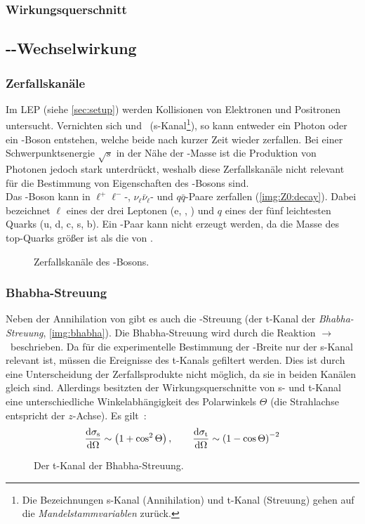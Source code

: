\subsubsection{Wirkungsquerschnitt }
\subsection{\texorpdfstring{\elp-\elm}{e+/e-}-Wechselwirkung}
\subsubsection{Zerfallskanäle}
Im LEP (siehe \autoref{sec:setup}) werden Kollisionen von Elektronen und Positronen untersucht.
Vernichten sich \elp und \elm\ (s-Kanal\footnote{Die Bezeichnungen s-Kanal (Annihilation) und t-Kanal (Streuung) gehen auf die 
\emph{Mandelstammvariablen} zurück.}), so kann entweder ein Photon oder ein \Z-Boson entstehen, welche beide nach kurzer Zeit wieder 
zerfallen. Bei einer Schwerpunktsenergie $\sqrt{s}$ in der Nähe der \Z-Masse ist die Produktion von Photonen jedoch stark unterdrückt, 
weshalb diese Zerfallskanäle nicht relevant für die Bestimmung von Eigenschaften des \Z-Bosons sind. \\
Das \Z-Boson kann in $\ell^+\ell^-$-, $\nu_\ell\bar{\nu}_\ell$- und $q\bar{q}$-Paare zerfallen (\autoref{img:Z0:decay}).
Dabei bezeichnet $\ell$ eines der drei Leptonen (e, \textmu, \texttau) und $q$ eines der fünf leichtesten Quarks (u, d, c, s, b). Ein -Paar 
kann nicht erzeugt werden, da die Masse des top-Quarks größer ist als die von \Z.
\begin{figure}[H]
        \centering
        \def\svgwidth{0.7\textwidth}
       
        \caption{Zerfallskanäle des \Z-Bosons.}
        \label{img:Z0:decay}
\end{figure}
\subsubsection{Bhabha-Streuung}
Neben der Annihilation von \ee gibt es auch die \ee-Streuung
(der t-Kanal der \emph{Bha\-bha-Streu\-ung}, \autoref{img:bhabha}).
Die Bhabha-Streuung wird durch die Reaktion \ee$\to$\ee\ beschrieben.
Da für die experimentelle Bestimmung der \Z-Breite nur der s-Kanal relevant ist, müssen die Ereignisse des t-Kanals gefiltert werden. 
Dies ist durch eine Unterscheidung der Zerfallsprodukte nicht möglich, da sie in beiden Kanälen gleich sind. Allerdings besitzten 
der Wirkungsquerschnitte von s- und t-Kanal eine unterschiedliche Winkelabhängigkeit des Polarwinkels $\Theta$ 
(die Strahlachse entspricht der $z$-Achse). Es gilt~\cite{manual}:
\begin{equation}
    \label{eq:stchannel:sigmas}
    \frac{\mathrm{d} \sigma_\text{s}}{\mathrm{d} \Omega} \sim \left( 1 + \cos^2 \Theta \right), \qquad 
    \frac{\mathrm{d} \sigma_\text{t}}{\mathrm{d} \Omega} \sim \left( 1 - \cos \Theta \right)^{-2}
\end{equation}
\begin{figure}[H]
        \centering
        \def\svgwidth{0.5\textwidth}
       
        \caption{Der t-Kanal der Bhabha-Streuung.}
        \label{img:bhabha}
\end{figure}
